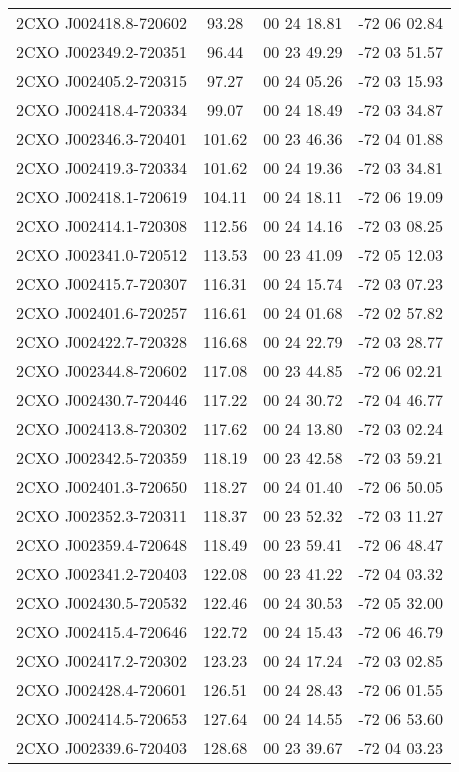 \begin{table}
\begin{tabular}{cccc}
2CXO J002418.8-720602 & 93.28 & 00 24 18.81 & -72 06 02.84 \\
2CXO J002349.2-720351 & 96.44 & 00 23 49.29 & -72 03 51.57 \\
2CXO J002405.2-720315 & 97.27 & 00 24 05.26 & -72 03 15.93 \\
2CXO J002418.4-720334 & 99.07 & 00 24 18.49 & -72 03 34.87 \\
2CXO J002346.3-720401 & 101.62 & 00 23 46.36 & -72 04 01.88 \\
2CXO J002419.3-720334 & 101.62 & 00 24 19.36 & -72 03 34.81 \\
2CXO J002418.1-720619 & 104.11 & 00 24 18.11 & -72 06 19.09 \\
2CXO J002414.1-720308 & 112.56 & 00 24 14.16 & -72 03 08.25 \\
2CXO J002341.0-720512 & 113.53 & 00 23 41.09 & -72 05 12.03 \\
2CXO J002415.7-720307 & 116.31 & 00 24 15.74 & -72 03 07.23 \\
2CXO J002401.6-720257 & 116.61 & 00 24 01.68 & -72 02 57.82 \\
2CXO J002422.7-720328 & 116.68 & 00 24 22.79 & -72 03 28.77 \\
2CXO J002344.8-720602 & 117.08 & 00 23 44.85 & -72 06 02.21 \\
2CXO J002430.7-720446 & 117.22 & 00 24 30.72 & -72 04 46.77 \\
2CXO J002413.8-720302 & 117.62 & 00 24 13.80 & -72 03 02.24 \\
2CXO J002342.5-720359 & 118.19 & 00 23 42.58 & -72 03 59.21 \\
2CXO J002401.3-720650 & 118.27 & 00 24 01.40 & -72 06 50.05 \\
2CXO J002352.3-720311 & 118.37 & 00 23 52.32 & -72 03 11.27 \\
2CXO J002359.4-720648 & 118.49 & 00 23 59.41 & -72 06 48.47 \\
2CXO J002341.2-720403 & 122.08 & 00 23 41.22 & -72 04 03.32 \\
2CXO J002430.5-720532 & 122.46 & 00 24 30.53 & -72 05 32.00 \\
2CXO J002415.4-720646 & 122.72 & 00 24 15.43 & -72 06 46.79 \\
2CXO J002417.2-720302 & 123.23 & 00 24 17.24 & -72 03 02.85 \\
2CXO J002428.4-720601 & 126.51 & 00 24 28.43 & -72 06 01.55 \\
2CXO J002414.5-720653 & 127.64 & 00 24 14.55 & -72 06 53.60 \\
2CXO J002339.6-720403 & 128.68 & 00 23 39.67 & -72 04 03.23 \\

\end{tabular}
\end{table}
